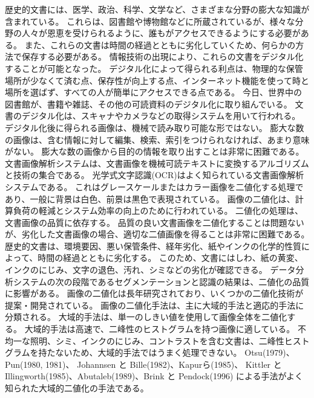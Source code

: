 \documentclass[uplatex, twocolumn,10pt]{jsarticle}
\begin{document}
歴史的文書には、医学、政治、科学、文学など、さまざまな分野の膨大な知識が含まれている。
これらは、図書館や博物館などに所蔵されているが、様々な分野の人々が恩恵を受けられるように、誰もがアクセスできるようにする必要がある。
また、これらの文書は時間の経過とともに劣化していくため、何らかの方法で保存する必要がある。
情報技術の出現により、これらの文書をデジタル化することが可能となった。
デジタル化によって得られる利点は、物理的な保管場所が少なくて済む点、保存性が向上する点、インターネット機能を使って時と場所を選ばず、すべての人が簡単にアクセスできる点である。
今日、世界中の図書館が、書籍や雑誌、その他の可読資料のデジタル化に取り組んでいる。
文書のデジタル化は、スキャナやカメラなどの取得システムを用いて行われる。
デジタル化後に得られる画像は、機械で読み取り可能な形ではない。
膨大な数の画像は、含む情報に対して編集、検索、索引をつけられなければ、あまり意味がない。
膨大な数の画像から目的の情報を取り出すことは非常に困難である。
文書画像解析システムは、文書画像を機械可読テキストに変換するアルゴリズムと技術の集合である。
光学式文字認識(OCR)はよく知られている文書画像解析システムである。
これはグレースケールまたはカラー画像を二値化する処理であり、一般に背景は白色、前景は黒色で表現されている。
画像の二値化は、計算負荷の軽減とシステム効率の向上のために行われている。
二値化の処理は、文書画像の品質に依存する。
品質の良い文書画像を二値化することは問題ないが、劣化した文書画像の場合、適切な二値画像を得ることは非常に困難である。
歴史的文書は、環境要因、悪い保管条件、経年劣化、紙やインクの化学的性質によって、時間の経過とともに劣化する。
このため、文書にはしわ、紙の黄変、インクのにじみ、文字の退色、汚れ、シミなどの劣化が確認できる。
データ分析システムの次の段階であるセグメンテーションと認識の結果は、二値化の品質に影響がある。
画像の二値化は長年研究されており、いくつかの二値化技術が提案・開発されている。
画像の二値化手法は、主に大域的手法と適応的手法に分類される。
大域的手法は、単一のしきい値を使用して画像全体を二値化する。
大域的手法は高速で、二峰性のヒストグラムを持つ画像に適している。
不均一な照明、シミ、インクのにじみ、コントラストを含む文書は、二峰性ヒストグラムを持たないため、大域的手法ではうまく処理できない。
Otsu(1979)\cite{bib1}、 Pun(1980, 1981)\cite{bib2}\cite{bib3}、 Johannsen と Bille(1982)\cite{bib4}、Kapurら(1985)\cite{bib5}、
Kittler と Illingworth(1985)\cite{bib6}、Abutaleb(1989)\cite{bib7}、Brink と Pendock(1996)\cite{bib8}
による手法がよく知られた大域的二値化の手法である。
\end{document}
